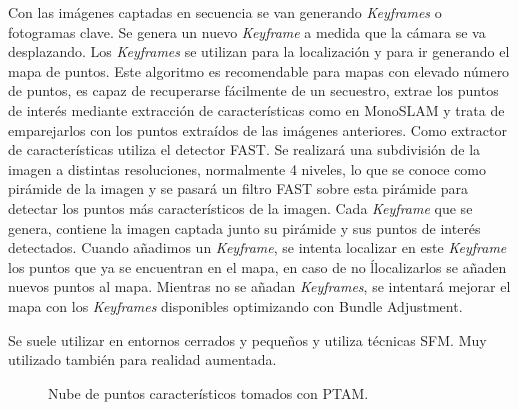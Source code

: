 Con las imágenes captadas en secuencia se van generando \textit{Keyframes} o fotogramas clave. Se genera un nuevo \textit{Keyframe} a medida que la cámara se va desplazando. Los \textit{Keyframes} se utilizan para la localización y para ir generando el mapa de puntos.
Este algoritmo es recomendable para mapas con elevado número de puntos, es capaz de recuperarse fácilmente de un secuestro, extrae los puntos de interés mediante extracción de características como en MonoSLAM y trata de emparejarlos con los puntos extraídos de las imágenes anteriores.  Como extractor de características utiliza el detector FAST. Se realizará una subdivisión de la imagen a distintas resoluciones, normalmente 4 niveles, lo que se conoce como pirámide de la imagen y se pasará un filtro FAST sobre esta pirámide para detectar los puntos más característicos de la imagen.
Cada \textit{Keyframe} que se genera, contiene  la imagen captada junto su pirámide y sus puntos de interés detectados. Cuando añadimos un \textit{Keyframe}, se intenta localizar en este \textit{Keyframe} los puntos que ya se encuentran en el mapa, en caso de no ĺlocalizarlos se añaden nuevos puntos al mapa. Mientras no se añadan \textit{Keyframes}, se intentará mejorar el mapa con los \textit{Keyframes} disponibles optimizando con Bundle Adjustment.

Se suele utilizar en entornos cerrados y pequeños y utiliza técnicas SFM. Muy utilizado también para realidad aumentada.

\begin{figure}[H]
\begin{center}
\end{center}
\caption{Nube de puntos característicos tomados con PTAM.}
\end{figure}



